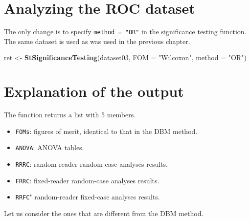 \documentclass[
]{book}
\newenvironment{Shaded}{\begin{snugshade}}{\end{snugshade}}
\newcommand{\DataTypeTok}[1]{\textcolor[rgb]{0.13,0.29,0.53}{#1}}
\newcommand{\KeywordTok}[1]{\textcolor[rgb]{0.13,0.29,0.53}{\textbf{#1}}}
\newcommand{\NormalTok}[1]{#1}
\newcommand{\StringTok}[1]{\textcolor[rgb]{0.31,0.60,0.02}{#1}}
\providecommand{\tightlist}{%
  \setlength{\itemsep}{0pt}\setlength{\parskip}{0pt}}
\begin{document}
\hypertarget{quick-start-or-text-analyze-dataset}{%
\section{Analyzing the ROC dataset}\label{quick-start-or-text-analyze-dataset}}

The only change is to specify \texttt{method\ =\ "OR"} in the significance testing function. The same dataset is used as was used in the previous chapter.

\begin{Shaded}
\begin{Highlighting}[]
\NormalTok{ret <-}\StringTok{ }\KeywordTok{StSignificanceTesting}\NormalTok{(dataset03, }\DataTypeTok{FOM =} \StringTok{"Wilcoxon"}\NormalTok{, }\DataTypeTok{method =} \StringTok{"OR"}\NormalTok{)}
\end{Highlighting}
\end{Shaded}

\hypertarget{quick-start-or-text-explanation}{%
\section{Explanation of the output}\label{quick-start-or-text-explanation}}

The function returns a list with 5 members.

\begin{itemize}
\tightlist
\item
  \texttt{FOMs}: figures of merit, identical to that in the DBM method.
\item
  \texttt{ANOVA}: ANOVA tables.
\item
  \texttt{RRRC}: random-reader random-case analyses results.
\item
  \texttt{FRRC}: fixed-reader random-case analyses results.
\item
  \texttt{RRFC}" random-reader fixed-case analyses results.
\end{itemize}

Let us consider the ones that are different from the DBM method.
\end{document}
